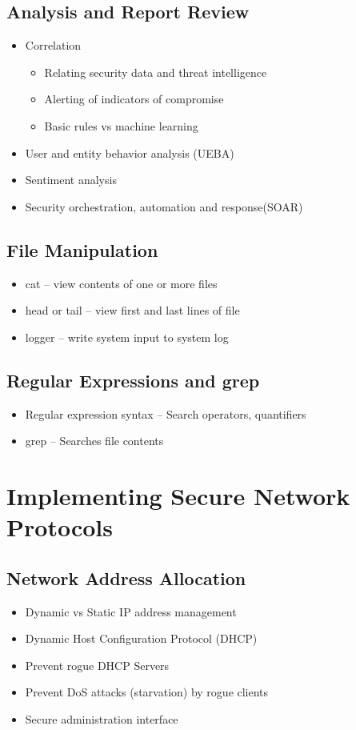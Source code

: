	\subsection {Analysis and Report Review}
		\begin{itemize}
			\item Correlation
				\begin{itemize}
					\item Relating security data and threat intelligence
					\item Alerting of indicators of compromise
					\item Basic rules vs machine learning
				\end{itemize}
			\item User and entity behavior analysis (UEBA)
			\item Sentiment analysis
			\item Security orchestration, automation and response(SOAR)
		\end{itemize}
	\subsection {File Manipulation}
		\begin{itemize}
			\item cat -- view contents of one or more files
			\item head or tail -- view first and last lines of file
			\item logger -- write system input to system log
		\end{itemize}
	\subsection {Regular Expressions and grep}
		\begin{itemize}
			\item Regular expression syntax -- Search operators, quantifiers
			\item grep -- Searches file contents
		\end{itemize}

\section {Implementing Secure Network Protocols}
	\subsection {Network Address Allocation}
		\begin{itemize}
			\item Dynamic vs Static IP address management
			\item Dynamic Host Configuration Protocol (DHCP)
			\item Prevent rogue DHCP Servers
			\item Prevent DoS attacks (starvation) by rogue clients
			\item Secure administration interface
		\end{itemize}
